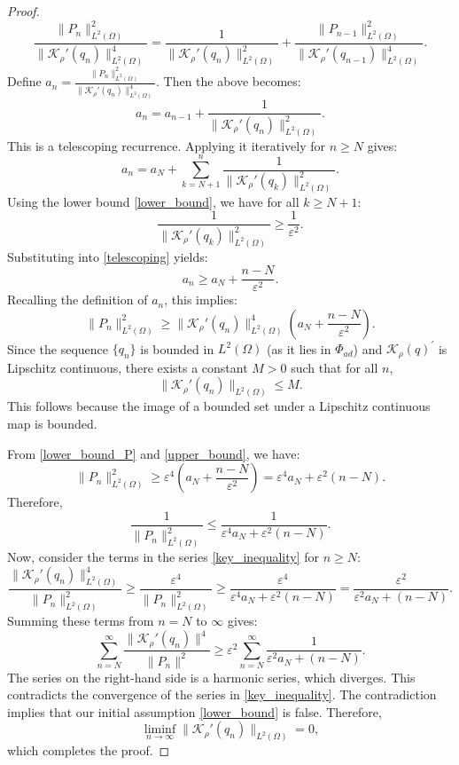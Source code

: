 \documentclass[a4paper,12pt,reqno,natbib]{amsart}
\begin{document}
{\begin{proof}
\[
\frac{\|P_n\|_{L^2(\Omega)}^2}{\|\mathcal{K}_\rho'(q_n)\|_{L^2(\Omega)}^4} = \frac{1}{\|\mathcal{K}_\rho'(q_n)\|_{L^2(\Omega)}^2} + \frac{\|P_{n-1}\|_{L^2(\Omega)}^2}{\|\mathcal{K}_\rho'(q_{n-1})\|_{L^2(\Omega)}^4}.
\]
Define $a_n = \frac{\|P_n\|_{L^2(\Omega)}^2}{\|\mathcal{K}_\rho'(q_n)\|_{L^2(\Omega)}^4}$. Then the above becomes:
\[
a_n = a_{n-1} + \frac{1}{\|\mathcal{K}_\rho'(q_n)\|_{L^2(\Omega)}^2}.
\]
This is a telescoping recurrence. Applying it iteratively for $n \geq N$ gives:
\begin{equation} \label{telescoping}
a_n = a_N + \sum_{k=N+1}^{n} \frac{1}{\|\mathcal{K}_\rho'(q_k)\|_{L^2(\Omega)}^2}.
\end{equation}
Using the lower bound \eqref{lower_bound}, we have for all $k \geq N+1$:
\[
\frac{1}{\|\mathcal{K}_\rho'(q_k)\|_{L^2(\Omega)}^2} \geq \frac{1}{\varepsilon^2}.
\]
Substituting into \eqref{telescoping} yields:
\[
a_n \geq a_N + \frac{n - N}{\varepsilon^2}.
\]
Recalling the definition of $a_n$, this implies:
\begin{equation} \label{lower_bound_P}
\|P_n\|_{L^2(\Omega)}^2 \geq \|\mathcal{K}_\rho'(q_n)\|_{L^2(\Omega)}^4 \left( a_N + \frac{n - N}{\varepsilon^2} \right).
\end{equation}
Since the sequence $\{q_n\}$ is bounded in $L^2(\Omega)$ (as it lies in $\Phi_{ad}$) and $\mathcal{K}_\rho(q)^\prime$ is Lipschitz continuous, there exists a constant $M > 0$ such that for all $n$,
\begin{equation} \label{upper_bound}
\|\mathcal{K}_\rho'(q_n)\|_{L^2(\Omega)} \leq M.
\end{equation}
This follows because the image of a bounded set under a Lipschitz continuous map is bounded.

From \eqref{lower_bound_P} and \eqref{upper_bound}, we have:
\[
\|P_n\|_{L^2(\Omega)}^2 \geq \varepsilon^4 \left( a_N + \frac{n - N}{\varepsilon^2} \right) = \varepsilon^4 a_N + \varepsilon^2 (n - N).
\]
Therefore,
\[
\frac{1}{\|P_n\|_{L^2(\Omega)}^2} \leq \frac{1}{\varepsilon^4 a_N + \varepsilon^2 (n - N)}.
\]
Now, consider the terms in the series \eqref{key_inequality} for $n \geq N$:
\[
\frac{\|\mathcal{K}_\rho'(q_n)\|_{L^2(\Omega)}^4}{\|P_n\|_{L^2(\Omega)}^2} \geq \frac{\varepsilon^4}{\|P_n\|_{L^2(\Omega)}^2} \geq \frac{\varepsilon^4}{\varepsilon^4 a_N + \varepsilon^2 (n - N)} = \frac{\varepsilon^2}{\varepsilon^2 a_N + (n - N)}.
\]
Summing these terms from $n = N$ to $\infty$ gives:
\[
\sum_{n=N}^{\infty} \frac{\|\mathcal{K}_\rho'(q_n)\|^4}{\|P_n\|^2} \geq \varepsilon^2 \sum_{n=N}^{\infty} \frac{1}{\varepsilon^2 a_N + (n - N)}.
\]
The series on the right-hand side is a harmonic series, which diverges. This contradicts the convergence of the series in \eqref{key_inequality}.
The contradiction implies that our initial assumption \eqref{lower_bound} is false. Therefore,
\[
\liminf_{n\to\infty} \|\mathcal{K}_\rho'(q_n)\|_{L^2(\Omega)} = 0,
\]
which completes the proof.
\end{proof}





}
\end{document}
